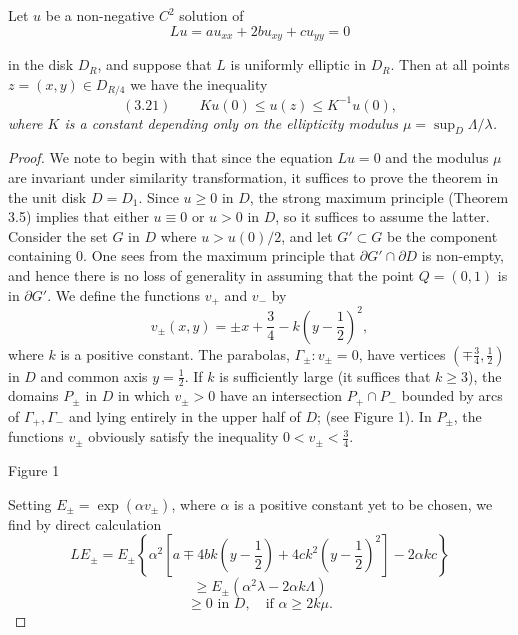 \begin{theorem}\label{gt-ch3-harnack}
Let $u$ be a non-negative $C^2$ solution of
\[
Lu=au_{xx}+2bu_{xy}+cu_{yy}=0
\]

in the disk $D_R$, and suppose that $L$ is uniformly elliptic in $D_R$. Then at all points $z=(x, y)\in D_{R/4}$ we have the inequality
\[
(3.21)\qquad Ku(0)\le u(z)\le K^{-1}u(0),
\]
\textit{where $K$ is a constant depending only on the ellipticity modulus $\mu=\sup_D \Lambda/\lambda$.}
\end{theorem}

\begin{proof}
We note to begin with that since the equation $Lu=0$ and the modulus $\mu$ are invariant under similarity transformation, it suffices to prove the theorem in the unit disk $D=D_1$. Since $u\ge 0$ in $D$, the strong maximum principle (Theorem 3.5) implies that either $u\equiv 0$ or $u>0$ in $D$, so it suffices to assume the latter. Consider the set $G$ in $D$ where $u>u(0)/2$, and let $G'\subset G$ be the component containing $0$. One sees from the maximum principle that $\partial G'\cap \partial D$ is non-empty, and hence there is no loss of generality in assuming that the point $Q=(0,1)$ is in $\partial G'$. We define the functions $v_+$ and $v_-$ by
\[
v_{\pm}(x, y)=\pm x+\frac{3}{4}-k\left(y-\frac{1}{2}\right)^2,
\]
where $k$ is a positive constant. The parabolas, $\Gamma_{\pm} : v_{\pm}=0$, have vertices $\left(\mp \frac{3}{4}, \frac{1}{2}\right)$ in $D$ and common axis $y=\frac{1}{2}$. If $k$ is sufficiently large (it suffices that $k\ge 3$), the domains $P_{\pm}$ in $D$ in which $v_{\pm}>0$ have an intersection $P_+\cap P_-$ bounded by arcs of $\Gamma_+,\Gamma_-$ and lying entirely in the upper half of $D$; (see Figure 1). In $P_{\pm}$, the functions $v_{\pm}$ obviously satisfy the inequality $0<v_{\pm}<\frac{3}{4}$.

Figure 1

Setting $E_{\pm}=\exp(\alpha v_{\pm})$, where $\alpha$ is a positive constant yet to be chosen, we find by direct calculation
\[
LE_{\pm}=E_{\pm}\left\{\alpha^2\left[a\mp 4bk\left(y-\frac{1}{2}\right)+4ck^2\left(y-\frac{1}{2}\right)^2\right]-2\alpha kc\right\}
\]
\[
\ge E_{\pm}\left(\alpha^2\lambda-2\alpha k\Lambda\right)
\]
\[
\ge 0\text{ in }D,\quad \text{if }\alpha\ge 2k\mu.
\]


\end{proof}
